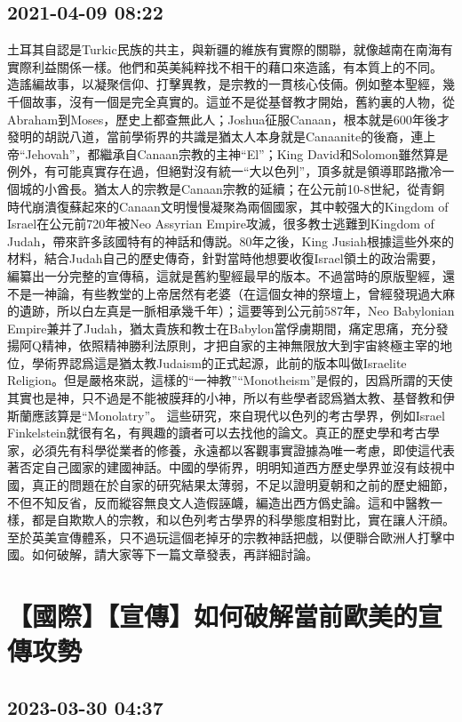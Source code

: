 \documentclass[twocolumn]{ctexart}
\begin{document}
\subsection*{2021-04-09 08:22}

土耳其自認是Turkic民族的共主，與新疆的維族有實際的關聯，就像越南在南海有實際利益關係一樣。他們和英美純粹找不相干的藉口來造謠，有本質上的不同。
造謠編故事，以凝聚信仰、打擊異教，是宗教的一貫核心伎倆。例如整本聖經，幾千個故事，沒有一個是完全真實的。這並不是從基督教才開始，舊約裏的人物，從Abraham到Moses，歷史上都查無此人；Joshua征服Canaan，根本就是600年後才發明的胡説八道，當前學術界的共識是猶太人本身就是Canaanite的後裔，連上帝“Jehovah”，都繼承自Canaan宗教的主神“El”；King David和Solomon雖然算是例外，有可能真實存在過，但絕對沒有統一“大以色列”，頂多就是領導耶路撒冷一個城的小酋長。猶太人的宗教是Canaan宗教的延續；在公元前10-8世紀，從青銅時代崩潰復蘇起來的Canaan文明慢慢凝聚為兩個國家，其中較强大的Kingdom of Israel在公元前720年被Neo Assyrian Empire攻滅，很多教士逃難到Kingdom of Judah，帶來許多該國特有的神話和傳説。80年之後，King Jusiah根據這些外來的材料，結合Judah自己的歷史傳奇，針對當時他想要收復Israel領土的政治需要，編纂出一分完整的宣傳稿，這就是舊約聖經最早的版本。不過當時的原版聖經，還不是一神論，有些教堂的上帝居然有老婆（在這個女神的祭壇上，曾經發現過大麻的遺跡，所以白左真是一脈相承幾千年）；這要等到公元前587年，Neo Babylonian Empire兼并了Judah，猶太貴族和教士在Babylon當俘虜期間，痛定思痛，充分發揚阿Q精神，依照精神勝利法原則，才把自家的主神無限放大到宇宙終極主宰的地位，學術界認爲這是猶太教Judaism的正式起源，此前的版本叫做Israelite Religion。但是嚴格來説，這樣的“一神教”“Monotheism”是假的，因爲所謂的天使其實也是神，只不過是不能被膜拜的小神，所以有些學者認爲猶太教、基督教和伊斯蘭應該算是“Monolatry”。
這些研究，來自現代以色列的考古學界，例如Israel Finkelstein就很有名，有興趣的讀者可以去找他的論文。真正的歷史學和考古學家，必須先有科學從業者的修養，永遠都以客觀事實證據為唯一考慮，即使這代表著否定自己國家的建國神話。中國的學術界，明明知道西方歷史學界並沒有歧視中國，真正的問題在於自家的研究結果太薄弱，不足以證明夏朝和之前的歷史細節，不但不知反省，反而縱容無良文人造假誣衊，編造出西方僞史論。這和中醫教一樣，都是自欺欺人的宗教，和以色列考古學界的科學態度相對比，實在讓人汗顔。
至於英美宣傳體系，只不過玩這個老掉牙的宗教神話把戲，以便聯合歐洲人打擊中國。如何破解，請大家等下一篇文章發表，再詳細討論。
\section*{【國際】【宣傳】如何破解當前歐美的宣傳攻勢}
\subsection*{2023-03-30 04:37}
\end{document}

